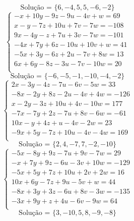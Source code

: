 \documentclass[12pt,oneside,a4paper]{article}
\begin{document}
\begin{equation*}
\text{Solução = }\{6,-4,5,5,-6,-2\}
\end{equation*}
\vspace{\baselineskip}
\begin{equation*}
\begin{cases}
-x+10y-9z-9u-4v+w=69 \\
x-y-7z+10u+7v-7w=-108 \\
9x-4y-z+7u+3v-7w=-101 \\
-4x+7y+6z-10u+10v+w=41 \\
-5x+3y-6z+2u-7v+8w=13 \\
6x+6y-8z-3u-7v-10w=20 \\
\end{cases}
\end{equation*}
\begin{equation*}
\text{Solução = }\{-6,-5,-1,-10,-4,-2\}
\end{equation*}
\vspace{\baselineskip}
\begin{equation*}
\begin{cases}
2x-3y-4z-7u-6v-5w=33 \\
-8x-2y+8z-2u-4v+4w=-126 \\
x-2y-3z+10u+4v-10w=177 \\
-7x-7y+2z-7u+8v-6w=-61 \\
10x-y+4z+u-4v-2w=23 \\
-9x+5y-7z+10u-4v-4w=169 \\
\end{cases}
\end{equation*}
\begin{equation*}
\text{Solução = }\{2,4,-7,7,-2,-10\}
\end{equation*}
\vspace{\baselineskip}
\begin{equation*}
\begin{cases}
-5x-8y+9z-7u+9v-7w=29 \\
-x+7y+9z-6u-3v+10w=-129 \\
-5x+5y+7z+10u+2v+2w=16 \\
10x+6y-7z+9u-5v+w=44 \\
-8x+3y+3z-6u+8v-3w=-135 \\
-3x+9y+z+4u-6v-9w=64 \\
\end{cases}
\end{equation*}
\begin{equation*}
\text{Solução = }\{3,-10,5,8,-9,-8\}
\end{equation*}
\end{document}
